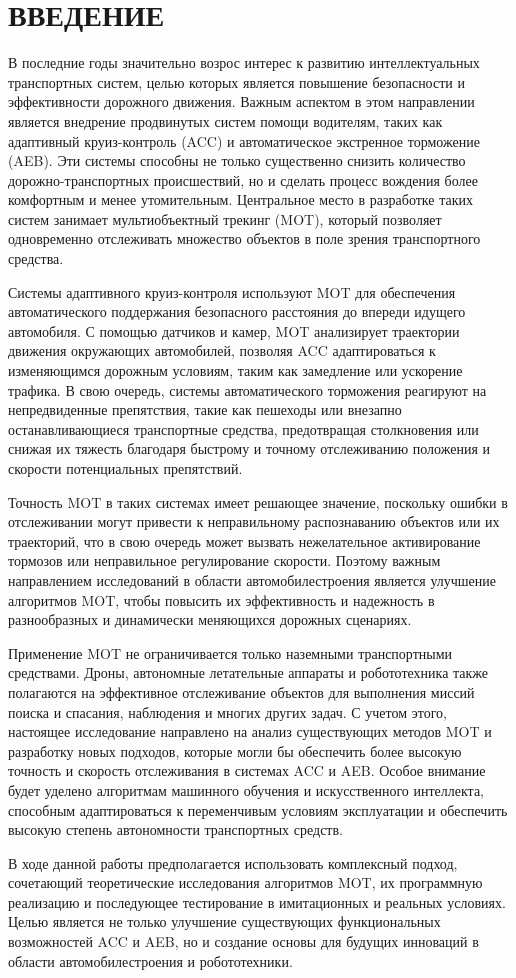 \chapter*{ВВЕДЕНИЕ}

В последние годы значительно возрос интерес к развитию интеллектуальных транспортных систем, целью которых является повышение безопасности и эффективности дорожного движения. Важным аспектом в этом направлении является внедрение продвинутых систем помощи водителям, таких как адаптивный круиз-контроль (ACC) и автоматическое экстренное торможение (AEB). Эти системы способны не только существенно снизить количество дорожно-транспортных происшествий, но и сделать процесс вождения более комфортным и менее утомительным. Центральное место в разработке таких систем занимает мультиобъектный трекинг (MOT), который позволяет одновременно отслеживать множество объектов в поле зрения транспортного средства.

Системы адаптивного круиз-контроля используют MOT для обеспечения автоматического поддержания безопасного расстояния до впереди идущего автомобиля. С помощью датчиков и камер, MOT анализирует траектории движения окружающих автомобилей, позволяя ACC адаптироваться к изменяющимся дорожным условиям, таким как замедление или ускорение трафика. В свою очередь, системы автоматического торможения реагируют на непредвиденные препятствия, такие как пешеходы или внезапно останавливающиеся транспортные средства, предотвращая столкновения или снижая их тяжесть благодаря быстрому и точному отслеживанию положения и скорости потенциальных препятствий.

Точность MOT в таких системах имеет решающее значение, поскольку ошибки в отслеживании могут привести к неправильному распознаванию объектов или их траекторий, что в свою очередь может вызвать нежелательное активирование тормозов или неправильное регулирование скорости. Поэтому важным направлением исследований в области автомобилестроения является улучшение алгоритмов MOT, чтобы повысить их эффективность и надежность в разнообразных и динамически меняющихся дорожных сценариях.

Применение MOT не ограничивается только наземными транспортными средствами. Дроны, автономные летательные аппараты и робототехника также полагаются на эффективное отслеживание объектов для выполнения миссий поиска и спасания, наблюдения и многих других задач. С учетом этого, настоящее исследование направлено на анализ существующих методов MOT и разработку новых подходов, которые могли бы обеспечить более высокую точность и скорость отслеживания в системах ACC и AEB. Особое внимание будет уделено алгоритмам машинного обучения и искусственного интеллекта, способным адаптироваться к переменчивым условиям эксплуатации и обеспечить высокую степень автономности транспортных средств.

В ходе данной работы предполагается использовать комплексный подход, сочетающий теоретические исследования алгоритмов MOT, их программную реализацию и последующее тестирование в имитационных и реальных условиях. Целью является не только улучшение существующих функциональных возможностей ACC и AEB, но и создание основы для будущих инноваций в области автомобилестроения и {робототехники}.
